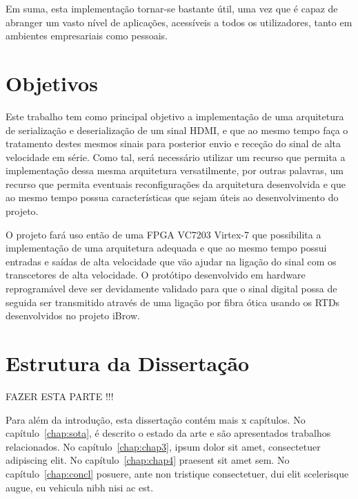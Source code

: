 Em suma, esta implementação tornar-se bastante útil, uma vez que é capaz de abranger um vasto nível de aplicações, acessíveis a todos os utilizadores, tanto em ambientes empresariais como pessoais.

\section{Objetivos} \label{sec:struct}
Este trabalho tem como principal objetivo a implementação de uma arquitetura de serialização e deserialização de um sinal HDMI, e que ao mesmo tempo faça o tratamento destes mesmos sinais para posterior envio e receção do sinal de alta velocidade em série. Como tal, será necessário utilizar um recurso que permita a implementação dessa mesma arquitetura versatilmente, por outras palavras, um recurso que permita eventuais reconfigurações da arquitetura desenvolvida e que ao mesmo tempo possua características que sejam úteis ao desenvolvimento do projeto.

O projeto fará uso então de uma FPGA VC7203 Virtex-7 que possibilita a implementação de uma arquitetura adequada e que ao mesmo tempo possui entradas e saídas de alta velocidade que vão ajudar na ligação do sinal com os transcetores de alta velocidade. O protótipo desenvolvido em hardware reprogramável deve ser devidamente validado para que o sinal digital possa de seguida ser transmitido através de uma ligação por fibra ótica usando os RTDs desenvolvidos no projeto iBrow.

\section{Estrutura da Dissertação} \label{sec:struct}

FAZER ESTA PARTE !!!

Para além da introdução, esta dissertação contém mais x capítulos.
No capítulo~\ref{chap:sota}, é descrito o estado da arte e são
apresentados trabalhos relacionados. 
No capítulo~\ref{chap:chap3}, ipsum dolor sit amet, consectetuer
adipiscing elit.
No capítulo~\ref{chap:chap4} praesent sit amet sem. 
No capítulo~\ref{chap:concl}  posuere, ante non tristique
consectetuer, dui elit scelerisque augue, eu vehicula nibh nisi ac
est. 
